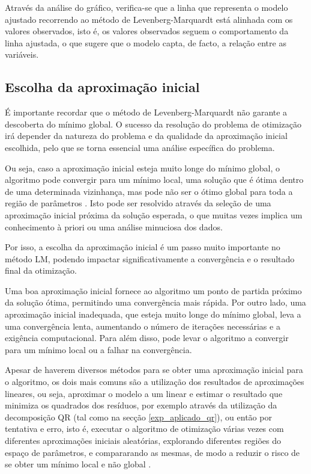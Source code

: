 \documentclass[]{article}
\numberwithin{equation}{subsection}
\begin{document}
Através da análise do gráfico, verifica-se que a linha que representa o
modelo ajustado recorrendo ao método de Levenberg-Marquardt está
alinhada com os valores observados, isto é, os valores observados seguem
o comportamento da linha ajustada, o que sugere que o modelo capta, de
facto, a relação entre as variáveis.

\subsection{Escolha da aproximação inicial}

É importante recordar que o método de Levenberg-Marquardt não garante a
descoberta do mínimo global. O sucesso da resolução do problema de
otimização irá depender da natureza do problema e da qualidade da
aproximação inicial escolhida, pelo que se torna essencial uma análise
específica do problema.

Ou seja, caso a aproximação inicial esteja muito longe do mínimo global,
o algoritmo pode convergir para um mínimo local, uma solução que é ótima
dentro de uma determinada vizinhança, mas pode não ser o ótimo global
para toda a região de parâmetros \cite{GZDAJC20}. Isto pode ser
resolvido através da seleção de uma aproximação inicial próxima da
solução esperada, o que muitas vezes implica um conhecimento à priori ou
uma análise minuciosa dos dados.

Por isso, a escolha da aproximação inicial é um passo muito importante
no método LM, podendo impactar significativamente a convergência e o
resultado final da otimização.

Uma boa aproximação inicial fornece ao algoritmo um ponto de partida
próximo da solução ótima, permitindo uma convergência mais rápida. Por
outro lado, uma aproximação inicial inadequada, que esteja muito longe
do mínimo global, leva a uma convergência lenta, aumentando o número de
iterações necessárias e a exigência computacional. Para além disso, pode
levar o algoritmo a convergir para um mínimo local ou a falhar na
convergência.

Apesar de haverem diversos métodos para se obter uma aproximação inicial
para o algoritmo, os dois mais comuns são a utilização dos resultados de
aproximações lineares, ou seja, aproximar o modelo a um linear e estimar
o resultado que minimiza os quadrados dos resíduos, por exemplo através
da utilização da decomposição QR (tal como na secção
\ref{exp_aplicado_qr}), ou então por tentativa e erro, isto é, executar
o algoritmo de otimização várias vezes com diferentes aproximações
iniciais aleatórias, explorando diferentes regiões do espaço de
parâmetros, e compararando as mesmas, de modo a reduzir o risco de se
obter um mínimo local e não global \cite{GZDAJC20}.
\end{document}
